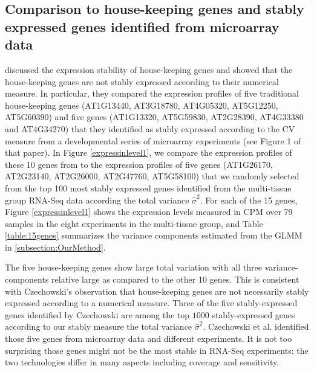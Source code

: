 \documentclass[11pt, a4paper]{article}
\begin{document}
\subsection{Comparison to house-keeping genes and stably expressed genes
identified from microarray data}\label{section:CompareStablyExpressedGene}
\cite{czechowski2005genome} discussed the expression stability of
house-keeping genes and showed that the house-keeping genes are not stably
expressed according to their numerical measure. In particular, they compared
the expression profiles of five traditional house-keeping genes (AT1G13440,
AT3G18780, AT4G05320, AT5G12250, AT5G60390) and five genes (AT1G13320,
AT5G59830, AT2G28390, AT4G33380 and AT4G34270) that they identified  as stably
expressed according to the CV measure from a developmental series of
microarray experiments (see Figure 1 of that paper).  
In Figure \ref{expressinlevel1}, we compare the expression profiles 
of these 10 genes from \cite{czechowski2005genome} to the expression profiles
of five genes (AT1G26170, AT2G23140, AT2G26000, AT2G47760, AT5G58100) that we
randomly selected from the top 100 most stably expressed genes identified from
the multi-tissue group RNA-Seq data according the total variance $\hat\sigma^2$.
For each of the 15 genes, Figure \ref{expressinlevel1} shows the expression levels measured
in CPM over 79 samples in the eight experiments in the multi-tissue group,
and Table \ref{table:15genes} summarizes the variance components estimated from the
GLMM in \ref{subsection:OurMethod}. 

The five house-keeping genes show large total variation with all three
variance-components relative large as compared to the other 10 genes. This is
consistent with Czechowski's observation that house-keeping genes are not necessarily stably
expressed according to a numerical measure. Three of the five
stably-expressed genes identified by Czechowski are among the top $1000$
stably-expressed genes according to our stably measure the total variance $\hat\sigma^2$. Czechowski et al.
identified those five genes from microarray data and different experiments. It
is not too surprising those genes might not be the most stable in RNA-Seq
experiments: the two technologies differ in many aspects including coverage
and sensitivity. 
\end{document}
